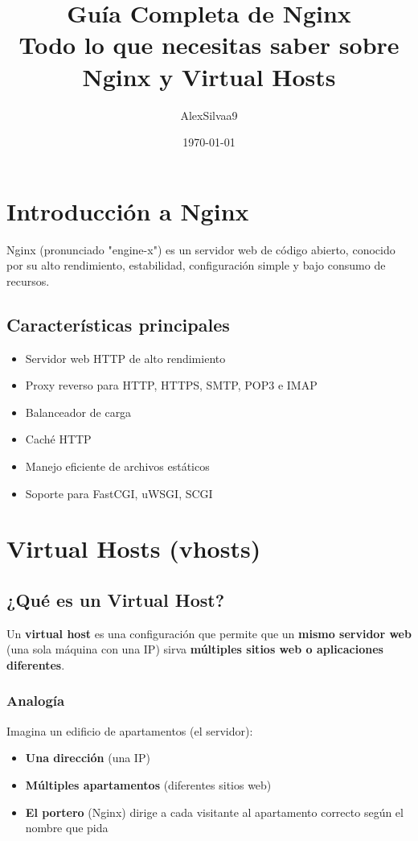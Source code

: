 \documentclass[11pt,a4paper]{article}
\title{
    \Huge\textbf{Guía Completa de Nginx} \\
    \Large Todo lo que necesitas saber sobre Nginx y Virtual Hosts
}
\author{AlexSilvaa9}
\date{\today}
\begin{document}
\maketitle
\newpage

\tableofcontents
\newpage

\section{Introducción a Nginx}

Nginx (pronunciado "engine-x") es un servidor web de código abierto, conocido por su alto rendimiento, estabilidad, configuración simple y bajo consumo de recursos.

\subsection{Características principales}

\begin{itemize}[leftmargin=*]
    \item Servidor web HTTP de alto rendimiento
    \item Proxy reverso para HTTP, HTTPS, SMTP, POP3 e IMAP
    \item Balanceador de carga
    \item Caché HTTP
    \item Manejo eficiente de archivos estáticos
    \item Soporte para FastCGI, uWSGI, SCGI
\end{itemize}

\section{Virtual Hosts (vhosts)}

\subsection{¿Qué es un Virtual Host?}

Un \textbf{virtual host} es una configuración que permite que un \textbf{mismo servidor web} (una sola máquina con una IP) sirva \textbf{múltiples sitios web o aplicaciones diferentes}.

\subsubsection{Analogía}
Imagina un edificio de apartamentos (el servidor):
\begin{itemize}
    \item \textbf{Una dirección} (una IP)
    \item \textbf{Múltiples apartamentos} (diferentes sitios web)
    \item \textbf{El portero} (Nginx) dirige a cada visitante al apartamento correcto según el nombre que pida
\end{itemize}
\end{document}
